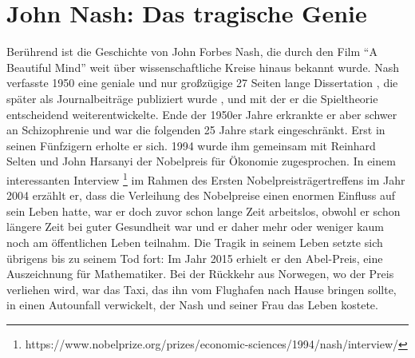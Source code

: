 \section{John Nash: Das tragische Genie}
Berührend ist die Geschichte von John Forbes Nash, die durch den Film "`A Beautiful Mind"' weit über wissenschaftliche Kreise hinaus bekannt wurde. Nash verfasste 1950 eine geniale und nur großzügige \parencite[S. 164]{Nash1994} 27 Seiten lange Dissertation \parencite{Nash1950}, die später als Journalbeiträge publiziert wurde \parencite{Nash1951}, und mit der er die Spieltheorie entscheidend weiterentwickelte. Ende der 1950er Jahre erkrankte er aber schwer an Schizophrenie und war die folgenden 25 Jahre stark eingeschränkt. Erst in seinen Fünfzigern erholte er sich. 1994 wurde ihm gemeinsam mit Reinhard Selten und John Harsanyi der Nobelpreis für Ökonomie zugesprochen. In einem interessanten Interview \parencite{Nash2004}\footnote{https://www.nobelprize.org/prizes/economic-sciences/1994/nash/interview/} im Rahmen des Ersten Nobelpreisträgertreffens im Jahr 2004 erzählt er, dass die Verleihung des Nobelpreise einen enormen Einfluss auf sein Leben hatte, war er doch zuvor schon lange Zeit arbeitslos, obwohl er schon längere Zeit bei guter Gesundheit war und er daher mehr oder weniger kaum noch am öffentlichen Leben teilnahm. Die Tragik in seinem Leben setzte sich übrigens bis zu seinem Tod fort: Im Jahr 2015 erhielt er den Abel-Preis, eine Auszeichnung für Mathematiker. Bei der Rückkehr aus Norwegen, wo der Preis verliehen wird, war das Taxi, das ihn vom Flughafen nach Hause bringen sollte, in einen Autounfall verwickelt, der Nash und seiner Frau das Leben kostete. 

